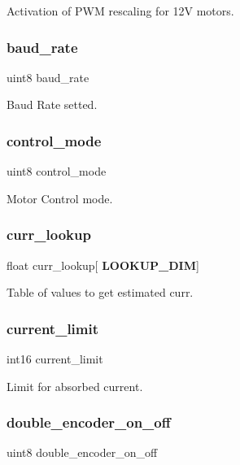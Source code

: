 Activation of P\+WM rescaling for 12V motors. \mbox{\label{structst__mem_a1a2b3002580421effeca67955a862580}} 
\subsubsection{baud\+\_\+rate}
{\footnotesize\ttfamily uint8 baud\+\_\+rate}

Baud Rate setted. \mbox{\label{structst__mem_af0c55b7d870673f2f6e9521c215d4b51}} 
\subsubsection{control\+\_\+mode}
{\footnotesize\ttfamily uint8 control\+\_\+mode}

Motor Control mode. \mbox{\label{structst__mem_a29cec4cab946141aae2509b04e2f5097}} 
\subsubsection{curr\+\_\+lookup}
{\footnotesize\ttfamily float curr\+\_\+lookup[\textbf{ L\+O\+O\+K\+U\+P\+\_\+\+D\+IM}]}

Table of values to get estimated curr. \mbox{\label{structst__mem_a96f2aec80e40c1bbe82186a4261ab7ac}} 
\subsubsection{current\+\_\+limit}
{\footnotesize\ttfamily int16 current\+\_\+limit}

Limit for absorbed current. \mbox{\label{structst__mem_a3d5832272cab9dc9f831471a9634b43e}} 
\subsubsection{double\+\_\+encoder\+\_\+on\+\_\+off}
{\footnotesize\ttfamily uint8 double\+\_\+encoder\+\_\+on\+\_\+off}

